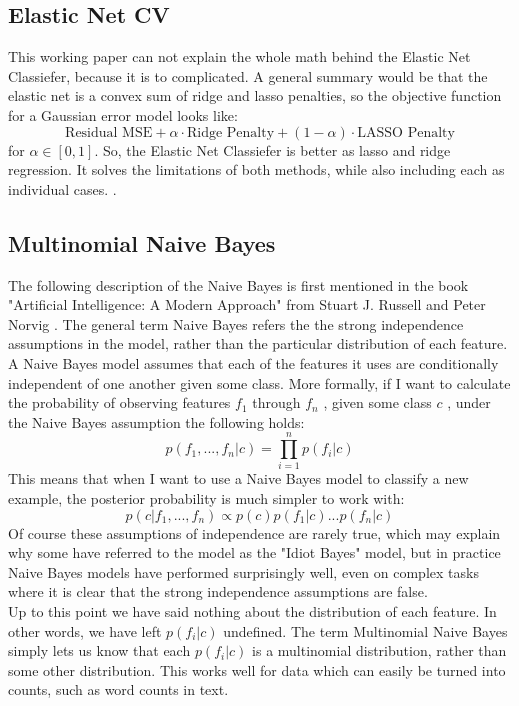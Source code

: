 \documentclass[journal]{IEEEtran}
\begin{document}
\subsection{Elastic Net CV}
\noindent This working paper can not explain the whole math behind the Elastic Net Classiefer, because it is to complicated. A general summary would be that the elastic net is a convex sum of ridge and lasso penalties, so the objective function for a Gaussian error model looks like:
\begin{equation}
\text{Residual MSE}+\alpha \cdot \text{Ridge Penalty}+(1-\alpha)\cdot \text{LASSO Penalty}
\end{equation}
for \(\alpha\in[0,1]\). 
So, the Elastic Net Classiefer is better as lasso and ridge regression.  It solves the limitations of both methods, while also including each as individual cases. \cite{Zou}.  
\subsection{Multinomial Naive Bayes}
\noindent The following description of the Naive Bayes is first mentioned in the book "Artificial Intelligence: A Modern Approach" from Stuart J. Russell and Peter Norvig \cite{Russell}.
The general term Naive Bayes refers the the strong independence assumptions in the model, rather than the particular distribution of each feature. A Naive Bayes model assumes that each of the features it uses are conditionally independent of one another given some class. More formally, if I want to calculate the probability of observing features \(f_1\) through \(f_n\) , given some class \(c\) , under the Naive Bayes assumption the following holds:
\begin{equation}
p(f_1,..., f_n|c) = \prod_{i=1}^n p(f_i|c)
\end{equation}
This means that when I want to use a Naive Bayes model to classify a new example, the posterior probability is much simpler to work with:
\begin{equation}
p(c|f_1,...,f_n) \propto p(c)p(f_1|c)...p(f_n|c)
\end{equation}
Of course these assumptions of independence are rarely true, which may explain why some have referred to the model as the "Idiot Bayes" model, but in practice Naive Bayes models have performed surprisingly well, even on complex tasks where it is clear that the strong independence assumptions are false.\\Up to this point we have said nothing about the distribution of each feature. In other words, we have left \(p(f_i|c)\) undefined. The term Multinomial Naive Bayes simply lets us know that each \(p(f_i|c)\) is a multinomial distribution, rather than some other distribution. This works well for data which can easily be turned into counts, such as word counts in text.
\end{document}
